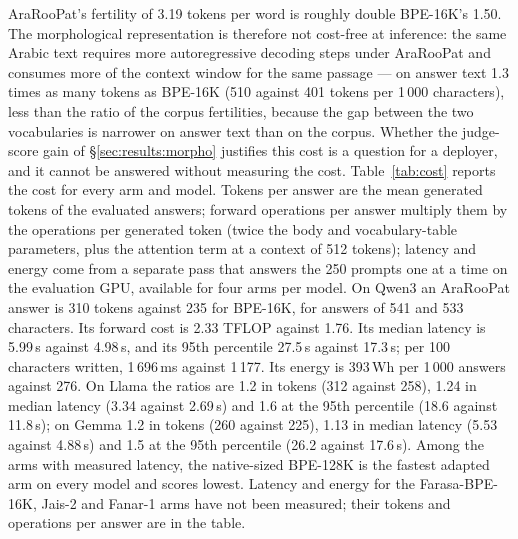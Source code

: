 \documentclass[a4paper,fleqn]{cas-sc}
\begin{document}
AraRooPat's fertility of 3.19 tokens per word is roughly double BPE-16K's 1.50. The morphological representation is therefore not cost-free at inference: the same Arabic text requires more autoregressive decoding steps under AraRooPat and consumes more of the context window for the same passage --- on answer text 1.3 times as many tokens as BPE-16K (510 against 401 tokens per 1\,000 characters), less than the ratio of the corpus fertilities, because the gap between the two vocabularies is narrower on answer text than on the corpus. Whether the judge-score gain of \S\ref{sec:results:morpho} justifies this cost is a question for a deployer, and it cannot be answered without measuring the cost.
Table~\ref{tab:cost} reports the cost for every arm and model. Tokens per answer are the mean generated tokens of the evaluated answers; forward operations per answer multiply them by the operations per generated token (twice the body and vocabulary-table parameters, plus the attention term at a context of 512 tokens); latency and energy come from a separate pass that answers the 250 prompts one at a time on the evaluation GPU, available for four arms per model. On Qwen3 an AraRooPat answer is 310 tokens against 235 for BPE-16K, for answers of 541 and 533 characters. Its forward cost is 2.33 TFLOP against 1.76. Its median latency is 5.99\,s against 4.98\,s, and its 95th percentile 27.5\,s against 17.3\,s; per 100 characters written, 1\,696\,ms against 1\,177. Its energy is 393\,Wh per 1\,000 answers against 276. On Llama the ratios are 1.2 in tokens (312 against 258), 1.24 in median latency (3.34 against 2.69\,s) and 1.6 at the 95th percentile (18.6 against 11.8\,s); on Gemma 1.2 in tokens (260 against 225), 1.13 in median latency (5.53 against 4.88\,s) and 1.5 at the 95th percentile (26.2 against 17.6\,s). Among the arms with measured latency, the native-sized BPE-128K is the fastest adapted arm on every model and scores lowest. Latency and energy for the Farasa-BPE-16K, Jais-2 and Fanar-1 arms have not been measured; their tokens and operations per answer are in the table.
\end{document}
